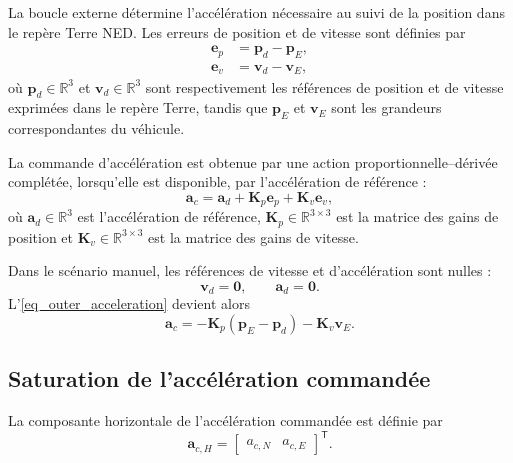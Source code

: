 \documentclass[11pt,a4paper,oneside]{report}
\newcommand{\vect}[1]{\bm{#1}}
\newcommand{\mat}[1]{\bm{#1}}
\newcommand{\trans}{^{\mathsf T}}
\begin{document}
La boucle externe détermine l'accélération nécessaire au suivi de la position dans le repère Terre NED. Les erreurs de position et de vitesse sont définies par
\begin{subequations}
	\label{eq_outer_loop_errors}
	\begin{align}
		\vect e_p
		&=
		\vect p_d-\vect p_E,
		\\
		\vect e_v
		&=
		\vect v_d-\vect v_E,
	\end{align}
\end{subequations}
où $\vect p_d\in\mathbb{R}^3$ et $\vect v_d\in\mathbb{R}^3$ sont respectivement les références de position et de vitesse exprimées dans le repère Terre, tandis que $\vect p_E$ et $\vect v_E$ sont les grandeurs correspondantes du véhicule.

La commande d'accélération est obtenue par une action proportionnelle--dérivée complétée, lorsqu'elle est disponible, par l'accélération de référence :
\begin{equation}
	\vect a_c
	=
	\vect a_d
	+
	\mat K_p\vect e_p
	+
	\mat K_v\vect e_v,
	\label{eq_outer_acceleration}
\end{equation}
où $\vect a_d\in\mathbb{R}^3$ est l'accélération de référence, $\mat K_p\in\mathbb{R}^{3\times3}$ est la matrice des gains de position et $\mat K_v\in\mathbb{R}^{3\times3}$ est la matrice des gains de vitesse.

Dans le scénario manuel, les références de vitesse et d'accélération sont nulles :
\begin{equation}
	\vect v_d=\vect 0,
	\qquad
	\vect a_d=\vect 0.
	\label{eq_manual_zero_references}
\end{equation}
L'\cref{eq_outer_acceleration} devient alors
\begin{equation}
	\vect a_c
	=
	-\mat K_p\left(\vect p_E-\vect p_d\right)
	-\mat K_v\vect v_E.
	\label{eq_outer_acceleration_manual}
\end{equation}

\subsection{Saturation de l'accélération commandée}

La composante horizontale de l'accélération commandée est définie par
\begin{equation}
	\vect a_{c,H}
	=
	\begin{bmatrix}
		a_{c,N} & a_{c,E}
	\end{bmatrix}\trans.
	\label{eq_horizontal_acceleration_command}
\end{equation}
\end{document}
